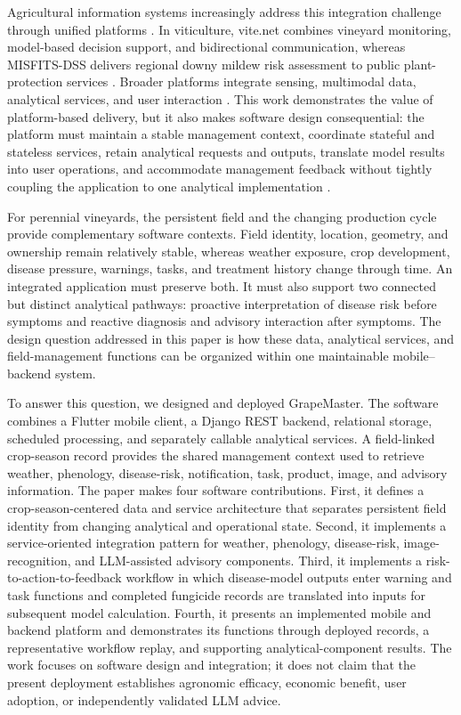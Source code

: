 \documentclass[12pt]{article}
\begin{document}
Agricultural information systems increasingly address this integration challenge through unified platforms \citep{fountasFarmManagementInformation2015,bakirScalableEndtoendIoT2026}. In viticulture, vite.net combines vineyard monitoring, model-based decision support, and bidirectional communication, whereas MISFITS-DSS delivers regional downy mildew risk assessment to public plant-protection services \citep{rossiAddressingImplementationProblem2014,bregaglioPublicDecisionSupport2022}. Broader platforms integrate sensing, multimodal data, analytical services, and user interaction \citep{chenAgriculturalAutonomousDecisionmaking2026}. This work demonstrates the value of platform-based delivery, but it also makes software design consequential: the platform must maintain a stable management context, coordinate stateful and stateless services, retain analytical requests and outputs, translate model results into user operations, and accommodate management feedback without tightly coupling the application to one analytical implementation \citep{romera2024digitalization,rossiSharingDecisionmakingTools2023}.

For perennial vineyards, the persistent field and the changing production cycle provide complementary software contexts. Field identity, location, geometry, and ownership remain relatively stable, whereas weather exposure, crop development, disease pressure, warnings, tasks, and treatment history change through time. An integrated application must preserve both. It must also support two connected but distinct analytical pathways: proactive interpretation of disease risk before symptoms and reactive diagnosis and advisory interaction after symptoms. The design question addressed in this paper is how these data, analytical services, and field-management functions can be organized within one maintainable mobile--backend system.

To answer this question, we designed and deployed GrapeMaster. The software combines a Flutter mobile client, a Django REST backend, relational storage, scheduled processing, and separately callable analytical services. A field-linked crop-season record provides the shared management context used to retrieve weather, phenology, disease-risk, notification, task, product, image, and advisory information. The paper makes four software contributions. First, it defines a crop-season-centered data and service architecture that separates persistent field identity from changing analytical and operational state. Second, it implements a service-oriented integration pattern for weather, phenology, disease-risk, image-recognition, and LLM-assisted advisory components. Third, it implements a risk-to-action-to-feedback workflow in which disease-model outputs enter warning and task functions and completed fungicide records are translated into inputs for subsequent model calculation. Fourth, it presents an implemented mobile and backend platform and demonstrates its functions through deployed records, a representative workflow replay, and supporting analytical-component results. The work focuses on software design and integration; it does not claim that the present deployment establishes agronomic efficacy, economic benefit, user adoption, or independently validated LLM advice.
\end{document}
